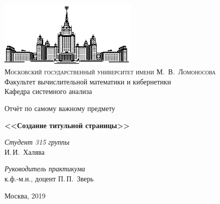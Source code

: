 \documentclass{subfiles}
\begin{document}
\thispagestyle{empty}

\begin{center}
\ \vspace{-3cm}

\includegraphics[width=0.5\textwidth]{msu.eps}\\
{\scshape Московский государственный университет имени М.~В.~Ломоносова}\\
Факультет вычислительной математики и кибернетики\\
Кафедра системного анализа

\vfill

{\LARGE Отчёт по самому важному предмету}

\vspace{1cm}

{\Huge\bfseries <<Создание титульной страницы>>}
\end{center}

\vspace{1cm}

\begin{flushright}
  \large
  \textit{Студент 315 группы}\\
  И.\,И.~Халява

  \vspace{5mm}

  \textit{Руководитель практикума}\\
  к.ф.-м.н., доцент П.\,П.~Зверь
\end{flushright}

\vfill

\begin{center}
Москва, 2019
\end{center}

\newpage
\end{document}
